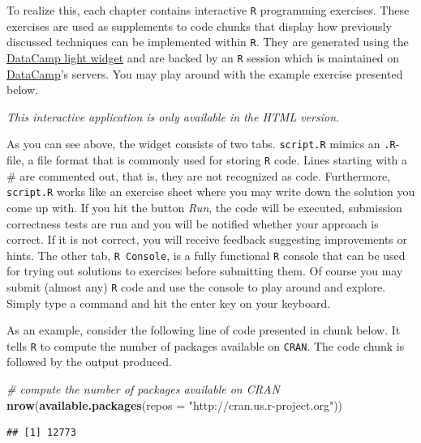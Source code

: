 \documentclass[]{book}
\newenvironment{Shaded}{\begin{snugshade}}{\end{snugshade}}
\newcommand{\KeywordTok}[1]{\textcolor[rgb]{0.13,0.29,0.53}{\textbf{#1}}}
\newcommand{\DataTypeTok}[1]{\textcolor[rgb]{0.13,0.29,0.53}{#1}}
\newcommand{\StringTok}[1]{\textcolor[rgb]{0.31,0.60,0.02}{#1}}
\newcommand{\CommentTok}[1]{\textcolor[rgb]{0.56,0.35,0.01}{\textit{#1}}}
\newcommand{\NormalTok}[1]{#1}
\theoremstyle{definition}
\theoremstyle{definition}
\theoremstyle{definition}
\theoremstyle{remark}
\begin{document}
To realize this, each chapter contains interactive \texttt{R}
programming exercises. These exercises are used as supplements to code
chunks that display how previously discussed techniques can be
implemented within \texttt{R}. They are generated using the
\href{https://github.com/datacamp/datacamp-light}{DataCamp light widget}
and are backed by an \texttt{R} session which is maintained on
\href{https://www.datacamp.com/home}{DataCamp}'s servers. You may play
around with the example exercise presented below.

\begin{center}\textit{This interactive application is only available in the HTML version.}\end{center}

As you can see above, the widget consists of two tabs. \texttt{script.R}
mimics an \texttt{.R}-file, a file format that is commonly used for
storing \texttt{R} code. Lines starting with a \# are commented out,
that is, they are not recognized as code. Furthermore, \texttt{script.R}
works like an exercise sheet where you may write down the solution you
come up with. If you hit the button \emph{Run}, the code will be
executed, submission correctness tests are run and you will be notified
whether your approach is correct. If it is not correct, you will receive
feedback suggesting improvements or hints. The other tab,
\texttt{R Console}, is a fully functional \texttt{R} console that can be
used for trying out solutions to exercises before submitting them. Of
course you may submit (almost any) \texttt{R} code and use the console
to play around and explore. Simply type a command and hit the enter key
on your keyboard.

As an example, consider the following line of code presented in chunk
below. It tells \texttt{R} to compute the number of packages available
on \texttt{CRAN}. The code chunk is followed by the output produced.

\begin{Shaded}
\begin{Highlighting}[]
\CommentTok{# compute the number of packages available on CRAN}
\KeywordTok{nrow}\NormalTok{(}\KeywordTok{available.packages}\NormalTok{(}\DataTypeTok{repos =} \StringTok{"http://cran.us.r-project.org"}\NormalTok{))}
\end{Highlighting}
\end{Shaded}

\begin{verbatim}
## [1] 12773
\end{verbatim}
\end{document}
